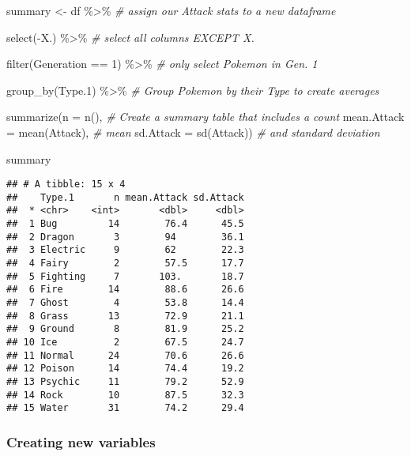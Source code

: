 \documentclass[
]{article}
\newenvironment{Shaded}{\begin{snugshade}}{\end{snugshade}}
\newcommand{\AttributeTok}[1]{\textcolor[rgb]{0.77,0.63,0.00}{#1}}
\newcommand{\CommentTok}[1]{\textcolor[rgb]{0.56,0.35,0.01}{\textit{#1}}}
\newcommand{\DecValTok}[1]{\textcolor[rgb]{0.00,0.00,0.81}{#1}}
\newcommand{\FloatTok}[1]{\textcolor[rgb]{0.00,0.00,0.81}{#1}}
\newcommand{\FunctionTok}[1]{\textcolor[rgb]{0.00,0.00,0.00}{#1}}
\newcommand{\NormalTok}[1]{#1}
\newcommand{\OtherTok}[1]{\textcolor[rgb]{0.56,0.35,0.01}{#1}}
\newcommand{\SpecialCharTok}[1]{\textcolor[rgb]{0.00,0.00,0.00}{#1}}
\begin{document}
\begin{Shaded}
\begin{Highlighting}[]
\NormalTok{summary }\OtherTok{\textless{}{-}}\NormalTok{  df }\SpecialCharTok{\%\textgreater{}\%}                          \CommentTok{\# assign our Attack stats to a new dataframe}
  
            \FunctionTok{select}\NormalTok{(}\SpecialCharTok{{-}}\NormalTok{X.) }\SpecialCharTok{\%\textgreater{}\%}                 \CommentTok{\# select all columns EXCEPT X.}
  
            \FunctionTok{filter}\NormalTok{(Generation }\SpecialCharTok{==} \DecValTok{1}\NormalTok{) }\SpecialCharTok{\%\textgreater{}\%}     \CommentTok{\# only select Pokemon in Gen. 1}
  
            \FunctionTok{group\_by}\NormalTok{(Type}\FloatTok{.1}\NormalTok{) }\SpecialCharTok{\%\textgreater{}\%}            \CommentTok{\# Group Pokemon by their Type to create averages}
  
            \FunctionTok{summarize}\NormalTok{(}\AttributeTok{n =} \FunctionTok{n}\NormalTok{(),              }\CommentTok{\# Create a summary table that includes a count}
              \AttributeTok{mean.Attack =} \FunctionTok{mean}\NormalTok{(Attack),          }\CommentTok{\# mean}
              \AttributeTok{sd.Attack =} \FunctionTok{sd}\NormalTok{(Attack))              }\CommentTok{\# and standard deviation}

\NormalTok{summary}
\end{Highlighting}
\end{Shaded}

\begin{verbatim}
## # A tibble: 15 x 4
##    Type.1       n mean.Attack sd.Attack
##  * <chr>    <int>       <dbl>     <dbl>
##  1 Bug         14        76.4      45.5
##  2 Dragon       3        94        36.1
##  3 Electric     9        62        22.3
##  4 Fairy        2        57.5      17.7
##  5 Fighting     7       103.       18.7
##  6 Fire        14        88.6      26.6
##  7 Ghost        4        53.8      14.4
##  8 Grass       13        72.9      21.1
##  9 Ground       8        81.9      25.2
## 10 Ice          2        67.5      24.7
## 11 Normal      24        70.6      26.6
## 12 Poison      14        74.4      19.2
## 13 Psychic     11        79.2      52.9
## 14 Rock        10        87.5      32.3
## 15 Water       31        74.2      29.4
\end{verbatim}

\hypertarget{creating-new-variables}{%
\subsubsection{Creating new variables}\label{creating-new-variables}}
\end{document}
